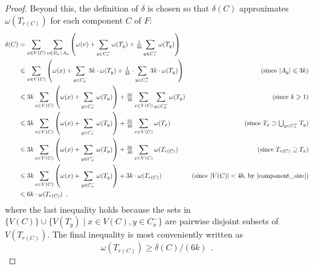 \begin{proof}
  
  Beyond this, the definition of $\delta$ is chosen so that $\delta(C)$ approximates $\omega(T_{r(C)})$ for each component $C$ of $F$:
  \begin{align}
    \delta(C) 
    & = \sum_{x\in V(C)}\sum_{v\in B_x\setminus A_x}\left(\omega(v)+\sum_{y\in C^-_v} \omega(T_y) 
      + \tfrac{1}{4b}\sum_{y\in C^+_v}\omega(T_y)\right) \nonumber \\
    & \le \sum_{x\in V(C)}\left(\omega(x)+\sum_{y\in C^-_x} 3k\cdot\omega(T_y) 
      + \tfrac{1}{4b}\cdot\sum_{y\in C^+_x}3k\cdot\omega(T_y)\right) 
      & \text{(since $|A_y|\le 3k$)} \nonumber\\
    & \le 3k\sum_{x\in V(C)}\left(\omega(x)+\sum_{y\in C^-_x} \omega(T_y)\right) 
      + \tfrac{3k}{4b}\sum_{x\in V(C)}\sum_{y\in C^+_x}\omega(T_y) 
      & \text{(since $k\ge 1$)}\nonumber\\
    & \le 3k\sum_{x\in V(C)}\left(\omega(x)+\sum_{y\in C^-_x} \omega(T_y)\right) 
      + \tfrac{3k}{4b}\sum_{x\in V(C)}\omega(T_{x}) 
      & \text{(since $\textstyle T_x\supset\bigcup_{y\in C^+_x}T_y$)}\nonumber\\
    & \le 3k\sum_{x\in V(C)}\left(\omega(x)+\sum_{y\in C^-_x} \omega(T_y)\right) 
      + \tfrac{3k}{4b}\sum_{x\in V(C)}\omega(T_{r(C)}) 
      & \text{(since $T_{r(C)}\supseteq T_x$)}\nonumber\\
    & \le 3k\sum_{x\in V(C)}\left(\omega(x)
      + \sum_{y\in C^-_x} \omega(T_y)\right) + 3k\cdot \omega(T_{r(C)}) 
      & \text{(since $|V(C)|<4b$, by \ref{component_size})} \nonumber \\
    & \le 6k\cdot\omega(T_{r(C)})
    \enspace . \label{delta_c_upper_bound}
  \end{align}
  where the last inequality holds because the sets in $\{V(C)\} \cup \{ V(T_y)\mid x\in V(C), y\in C^-_x\}$ are pairwise disjoint subsets of $V(T_{r(C)})$. The final inequality is most conveniently written as 
  \begin{equation}  
    \omega(T_{r(C)}) \ge \delta(C) / (6k) \enspace . \label{omega_trC_lower_bound}
  \end{equation}  


\end{proof}

